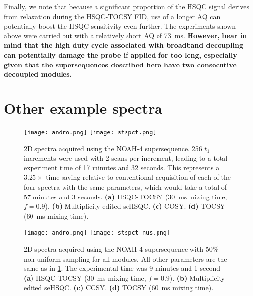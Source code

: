 Finally, we note that because a significant proportion of the HSQC signal derives from  relaxation during the HSQC-TOCSY FID, use of a longer AQ can potentially boost the HSQC sensitivity even further.
The experiments shown above were carried out with a relatively short AQ of \SI{73}{\ms}.
\textbf{However, bear in mind that the high duty cycle associated with broadband  decoupling can potentially damage the probe if applied for too long, especially given that the supersequences described here have two consecutive -decoupled modules.}

\section{Other example spectra}
\label{section:si_spectra}

\begin{figure}
    \centering
    \texttt{[image: andro.png]}\phantom{aaaaaa}
    \texttt{[image: stspct.png]}
    \caption{
        2D spectra acquired using the NOAH-4  supersequence.
        256 $t_1$ increments were used with 2 scans per increment, leading to a total experiment time of 17 minutes and 32 seconds.
        This represents a $3.25\times$ time saving relative to conventional acquisition of each of the four spectra with the same parameters, which would take a total of 57 minutes and 3 seconds.
        \textbf{(a)} HSQC-TOCSY (\SI{30}{ms} mixing time, $f = 0.9$).
        \textbf{(b)} Multiplicity edited seHSQC.
        \textbf{(c)} COSY.
        \textbf{(d)} TOCSY (\SI{60}{ms} mixing time).
        \andro{}
    }
    \label{fig:stspct}
\end{figure}

\begin{figure}
    \centering
    \texttt{[image: andro.png]}\phantom{aaaaaa}
    \texttt{[image: stspct\_nus.png]}
    \caption{
        2D spectra acquired using the NOAH-4  supersequence with 50\% non-uniform sampling for all modules.
        All other parameters are the same as in \cref{fig:stspct}.
        The experimental time was 9 minutes and 1 second.
        \textbf{(a)} HSQC-TOCSY (\SI{30}{ms} mixing time, $f = 0.9$).
        \textbf{(b)} Multiplicity edited seHSQC.
        \textbf{(c)} COSY.
        \textbf{(d)} TOCSY (\SI{60}{ms} mixing time).
        \andro{}
    }
    \label{fig:stspct_nus}
\end{figure}

